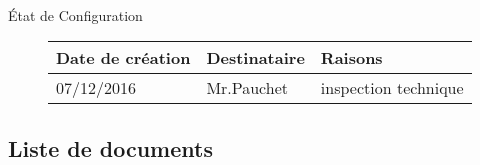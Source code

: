 \documentclass[asi, sansVersion]{picInsa}
\begin{document}
\begin{center}
\huge
\nomEquipe{}\\
État de Configuration\\
\end{center}
\vspace{0.5cm}


\begin{figure}[H]
		\centering
		\begin{tabularx}{17cm}{|p{4cm}|X|X|}
		\hline
		\rowcolor[gray]{0.85}Date de création & Destinataire & Raisons \\
		\hline
		07/12/2016 & Mr.Pauchet & inspection technique \\
		\hline
		\end{tabularx}
\end{figure}

\subsection*{Liste de documents}
\end{document}
